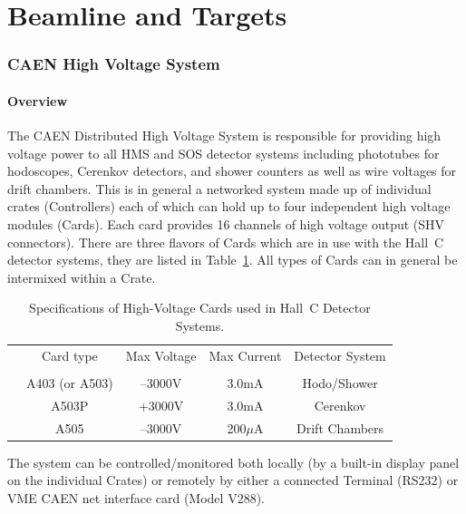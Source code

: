 %
%

\section{Beamline and Targets}





\subsubsection{CAEN High Voltage System}

\paragraph{Overview}

The CAEN Distributed High Voltage System is responsible for
providing high voltage power to all HMS and SOS detector systems
including phototubes for hodoscopes, Cerenkov detectors, and shower
counters as well as wire voltages for drift chambers.  This is in
general a networked system made up of individual crates (Controllers)
each of which can hold up to four independent high voltage modules
(Cards).  Each card provides 16 channels of high voltage output (SHV
connectors).  There are three flavors of Cards which are in use with the
Hall~C detector systems, they are listed in Table~\ref{tab:hv_cards}.  All types of Cards 
can in general be intermixed within a Crate.


\begin{table}
\caption{Specifications of High-Voltage Cards used in Hall~C Detector 
Systems\label{tab:hv_cards}.}
\begin{center}
\begin{tabular}{ccccc}
        &Card type      &Max Voltage    &Max Current    &Detector System \\
	&		&		&		&	\\
	& A403 (or A503)&--3000V		&3.0mA		&Hodo/Shower\\
	& A503P		&+3000V		&3.0mA		&Cerenkov\\
	& A505		&--3000V		&200$\mu$A 	&Drift Chambers\\
  \end{tabular}
\end{center}
\end{table}

The system can be controlled/monitored both locally (by a built-in
display panel on the individual Crates) or remotely by either a
connected Terminal (RS232) or VME CAEN net interface card (Model V288).


